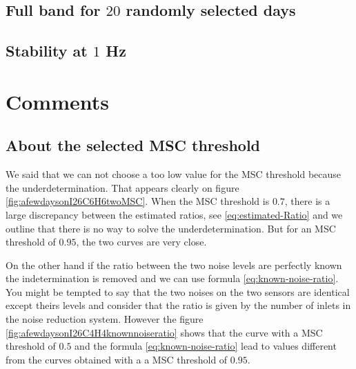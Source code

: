 \subsection{Full band for $20$ randomly selected days}

\newpage\clearpage
\subsection{Stability at $1$ Hz}

\newpage\clearpage
\section{Comments}
\subsection{About the selected MSC threshold}
We said that we can not choose a too low value for the MSC threshold because the underdetermination. That appears clearly on figure \ref{fig:afewdaysonI26C6H6twoMSC}.
When the  MSC threshold is $0.7$, there is a large discrepancy between the estimated ratios, see \eqref{eq:estimated-Ratio} and we outline that there is no way to solve the underdetermination. But for an MSC threshold of $0.95$, the two curves are very close.


On the other hand if the ratio between the two noise levels are perfectly known the indetermination is removed and we can use formula \eqref{eq:known-noise-ratio}. You might be tempted to say that the two noises on the two sensors are identical except theirs levels and consider that the ratio is given by the number of inlets in the noise reduction system. However the figure \ref{fig:afewdaysonI26C4H4knownnoiseratio} shows that the curve with a MSC threshold of $0.5$ and the formula \eqref{eq:known-noise-ratio} lead to values different from the curves obtained with a a MSC threshold of $0.95$.

